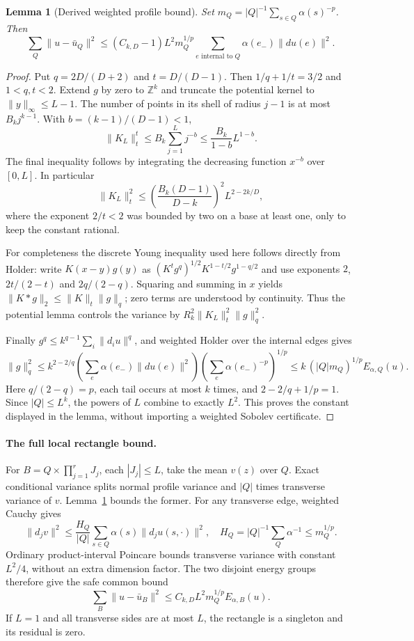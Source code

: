 \documentclass[11pt]{article}
\newtheorem{lemma}{Lemma}
\begin{document}
\begin{lemma}[Derived weighted profile bound]\label{lem:profile}
Set $m_Q=|Q|^{-1}\sum_{s\in Q}\alpha(s)^{-p}$. Then
\[
 \sum_Q\|u-\bar u_Q\|^2\le(C_{k,D}-1)L^2m_Q^{1/p}
 \sum_{e\text{ internal to }Q}\alpha(e_-)\|du(e)\|^2.
\]
\end{lemma}
\begin{proof}
Put $q=2D/(D+2)$ and $t=D/(D-1)$. Then $1/q+1/t=3/2$ and $1<q,t<2$. Extend $g$ by zero to $\mathbb Z^k$ and truncate the potential kernel to $\|y\|_\infty\le L-1$. The number of points in its shell of radius $j-1$ is at most $B_k j^{k-1}$. With $b=(k-1)/(D-1)<1$,
\[
 \|K_L\|_t^t\le B_k\sum_{j=1}^L j^{-b}
 \le\frac{B_k}{1-b}L^{1-b}.
\]
The final inequality follows by integrating the decreasing function $x^{-b}$ over $[0,L]$. In particular
\[
 \|K_L\|_t^2\le\left(\frac{B_k(D-1)}{D-k}\right)^2L^{2-2k/D},
\]
where the exponent $2/t<2$ was bounded by two on a base at least one, only to keep the constant rational.

For completeness the discrete Young inequality used here follows directly from Holder: write $K(x-y)g(y)$ as
$(K^tg^q)^{1/2}K^{1-t/2}g^{1-q/2}$ and use exponents $2$, $2t/(2-t)$ and $2q/(2-q)$. Squaring and summing in $x$ yields
$\|K*g\|_2\le\|K\|_t\|g\|_q$; zero terms are understood by continuity. Thus the potential lemma controls the variance by $R_k^2\|K_L\|_t^2\|g\|_q^2$.

Finally $g^q\le k^{q-1}\sum_i\|d_i u\|^q$, and weighted Holder over the internal edges gives
\[
 \|g\|_q^2\le k^{2-2/q}
 \left(\sum_e\alpha(e_-)\|du(e)\|^2\right)
 \left(\sum_e\alpha(e_-)^{-p}\right)^{1/p}
 \le k\,(|Q|m_Q)^{1/p} E_{\alpha,Q}(u).
\]
Here $q/(2-q)=p$, each tail occurs at most $k$ times, and
$2-2/q+1/p=1$. Since $|Q|\le L^k$, the powers of $L$ combine to exactly $L^2$. This proves the constant displayed in the lemma, without importing a weighted Sobolev certificate.
\end{proof}

\paragraph{The full local rectangle bound.}
For $B=Q\times\prod_{j=1}^r J_j$, each $|J_j|\le L$, take the mean $v(z)$ over $Q$. Exact conditional variance splits normal profile variance and $|Q|$ times transverse variance of $v$. Lemma~\ref{lem:profile} bounds the former. For any transverse edge, weighted Cauchy gives
\[
 \|d_jv\|^2\le\frac{H_Q}{|Q|}\sum_{s\in Q}\alpha(s)\|d_j u(s,\cdot)\|^2,
 \quad H_Q=|Q|^{-1}\sum_Q\alpha^{-1}\le m_Q^{1/p}.
\]
Ordinary product-interval Poincare bounds transverse variance with constant $L^2/4$, without an extra dimension factor. The two disjoint energy groups therefore give the safe common bound
\[
 \sum_B\|u-\bar u_B\|^2\le C_{k,D}L^2m_Q^{1/p}E_{\alpha,B}(u).
\]
If $L=1$ and all transverse sides are at most $L$, the rectangle is a singleton and its residual is zero.
\end{document}
